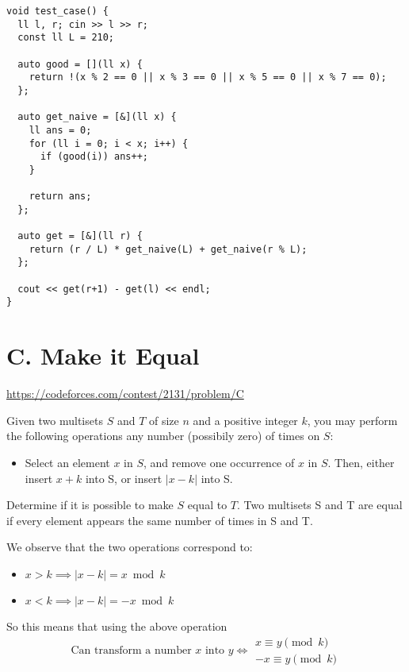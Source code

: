 \begin{verbatim}
void test_case() {
  ll l, r; cin >> l >> r;
  const ll L = 210;

  auto good = [](ll x) {
    return !(x % 2 == 0 || x % 3 == 0 || x % 5 == 0 || x % 7 == 0);
  };

  auto get_naive = [&](ll x) {
    ll ans = 0;
    for (ll i = 0; i < x; i++) {
      if (good(i)) ans++;
    }
    
    return ans;
  };

  auto get = [&](ll r) {
    return (r / L) * get_naive(L) + get_naive(r % L);
  };

  cout << get(r+1) - get(l) << endl;
}
\end{verbatim}

\section{C. Make it Equal}
\begin{sloppypar}
\url{https://codeforces.com/contest/2131/problem/C}
\end{sloppypar}

\begin{problem}
Given two multisets $S$ and $T$ of size $n$ and a positive integer $k$, you may perform the following operations any number (possibily zero) of times on $S$:

\begin{itemize}
    \item Select an element $x$ in $S$, and remove one occurrence of $x$ in $S$. Then, either insert $x+k$ into S, or insert $|x-k|$ into S.
\end{itemize}

Determine if it is possible to make $S$ equal to $T$. Two multisets S and T are equal if every element appears the same number of times in S and T.
\end{problem}

\begin{obs}
    We observe that the two operations correspond to:
    \begin{itemize}
        \item $x > k \implies |x - k| = x \bmod k$  
        \item $x < k \implies |x - k| = -x \bmod k$  
    \end{itemize}
\end{obs}

So this means that using the above operation
\begin{equation}
    \text{Can transform a number $x$ into $y \iff $}
    \begin{array}{c}
        x \equiv y \pmod k \\
        -x \equiv y \pmod k
    \end{array}
\end{equation}


